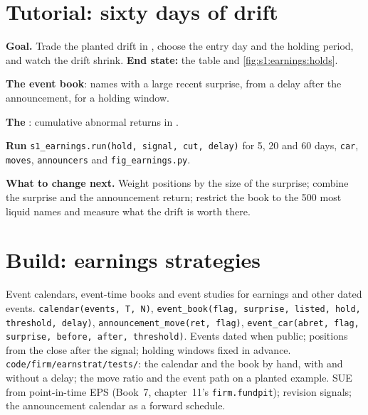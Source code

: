 \section{Tutorial: sixty days of drift}\label{tut:s1:earnings:tut}

\begin{tutorial}
\textbf{Goal.} Trade the planted drift in , choose the entry day and the holding period, and watch the drift shrink. \textbf{End state:} the
table and \cref{fig:s1:earnings:holds}.
\begin{tutsteps}
\item \textbf{The event book}: names with a large recent surprise, from a delay after the announcement, for a holding window.
\label{lst:s1:earnings:book}
\item \textbf{The }: cumulative abnormal returns in .
\label{lst:s1:earnings:car}
\item \textbf{Run} \texttt{s1\_earnings.run(hold, signal, cut, delay)} for 5, 20 and 60 days, \texttt{car}, \texttt{moves}, \texttt{announcers} and
\texttt{fig\_earnings.py}.
\end{tutsteps}
\textbf{What to change next.} Weight positions by the size of the surprise; combine the surprise and the announcement return; restrict the book to the 500
most liquid names and measure what the drift is worth there.
\end{tutorial}

\section{Build: earnings strategies}\label{bld:s1:earnings:earnstrat}

\begin{build}
 Event calendars, event-time books and event studies for earnings and other dated events.
 \texttt{calendar(events, T, N)}, \texttt{event\_book(flag, surprise, listed, hold, threshold, delay)}, \texttt{announcement\_move(ret,
flag)}, \texttt{event\_car(abret, flag, surprise, before, after, threshold)}.
 Events dated when public; positions from the close after the signal; holding windows fixed in advance.
 \texttt{code/firm/earnstrat/tests/}: the calendar and the book by hand, with and without a delay; the move ratio and the event
path on a planted example.
 SUE from point-in-time EPS (Book~7, chapter~11's \texttt{firm.fundpit}); revision signals; the announcement calendar as a forward schedule.
\end{build}

